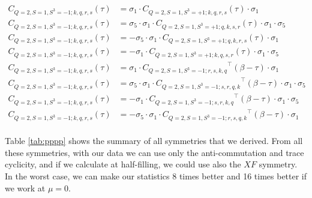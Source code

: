 \begin{equation}
  \begin{aligned}
    C_{Q=2,S=1,S^3=-1;k,q,r,s} (\tau) &= \sigma_1\cdot{C_{Q=2,S=1,S^3=+1;k,q,r,s}} (\tau) \cdot\sigma_1
    \\
    C_{Q=2,S=1,S^3=-1;k,q,r,s} (\tau) &= \sigma_5\cdot \sigma_1\cdot{C_{Q=2,S=1,S^3=+1;q,k,s,r}} (\tau) \cdot\sigma_1\cdot\sigma_5
    \\
    C_{Q=2,S=1,S^3=-1;k,q,r,s} (\tau) &= - \sigma_5\cdot \sigma_1\cdot{C_{Q=2,S=1,S^3=+1;q,k,r,s}} (\tau) \cdot\sigma_1
    \\
    C_{Q=2,S=1,S^3=-1;k,q,r,s} (\tau) &= - \sigma_1\cdot{C_{Q=2,S=1,S^3=+1;k,q,s,r}} (\tau) \cdot\sigma_1\cdot\sigma_5
    \\
    C_{Q=2,S=1,S^3=-1;k,q,r,s} (\tau) &= \sigma_1\cdot{C_{Q=2,S=1,S^3=-1;r,s,k,q}}^\top (\beta-\tau) \cdot\sigma_1 
    \\
    C_{Q=2,S=1,S^3=-1;k,q,r,s} (\tau) &= \sigma_5\cdot \sigma_1\cdot{C_{Q=2,S=1,S^3=-1;s,r,q,k}}^\top (\beta-\tau) \cdot\sigma_1\cdot\sigma_5
    \\
    C_{Q=2,S=1,S^3=-1;k,q,r,s} (\tau) &= - \sigma_1\cdot{C_{Q=2,S=1,S^3=-1;s,r,k,q}}^\top (\beta-\tau) \cdot\sigma_1\cdot\sigma_5 
    \\
    C_{Q=2,S=1,S^3=-1;k,q,r,s} (\tau) &= - \sigma_5\cdot \sigma_1\cdot{C_{Q=2,S=1,S^3=-1;r,s,q,k}}^\top (\beta-\tau) \cdot\sigma_1
    \\
  \end{aligned}
\end{equation}

Table \ref{tab:pppp} shows the summary of all symmetries that we derived. From all these symmetries, with our data we can use only the anti-commutation and trace cyclicity, and if we calculate at half-filling, we could use also the $XF$ symmetry. In the worst case, we can make our statistics 8 times better and 16 times better if we work at $\mu = 0$.

